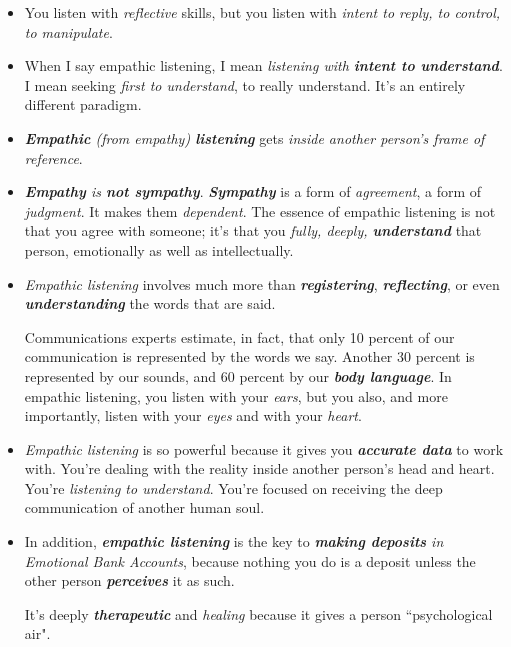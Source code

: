 \documentclass[11pt]{article}
\begin{document}
\begin{itemize}
\item You listen with \emph{reflective} skills, but you listen with \emph{intent to reply, to control, to manipulate}.

\item When I say empathic listening, I mean \emph{listening with \textbf{intent to understand}}. I mean seeking \emph{first to understand}, to really understand. It's an entirely different paradigm.

\item \emph{\textbf{Empathic} (from empathy) \textbf{listening}} gets \emph{inside another person's frame of reference}. 

\item \emph{\textbf{Empathy} is \textbf{not sympathy}}. \emph{\textbf{Sympathy}} is a form of \emph{agreement}, a form of \emph{judgment}. It makes them \emph{dependent}. The essence of empathic listening is not that you agree with someone; it's that you \emph{fully, deeply, \textbf{understand}} that person, emotionally as well as intellectually.

\item \emph{Empathic listening} involves much more than \emph{\textbf{registering}}, \emph{\textbf{reflecting}}, or even \emph{\textbf{understanding}} the words that are said.

Communications experts estimate, in fact, that only 10 percent of our communication is represented by the words we say. Another 30 percent is represented by our sounds, and 60 percent by our \emph{\textbf{body language}}. In empathic listening, you listen with your \emph{ears}, but you also, and more importantly, listen with your \emph{eyes} and with your \emph{heart}.

\item \emph{Empathic listening} is so powerful because it gives you \emph{\textbf{accurate data}} to work with. You're dealing with the reality inside another person's head and heart. You're \emph{listening to understand}. You're focused on receiving the deep communication of another human soul.

\item In addition, \emph{\textbf{empathic listening}} is the key to \emph{\textbf{making deposits} in Emotional Bank Accounts}, because nothing you do is a deposit unless the other person \emph{\textbf{perceives}} it as such. 

It's deeply \emph{\textbf{therapeutic}} and \emph{healing} because it gives a person ``psychological air".


\end{itemize}
\end{document}
